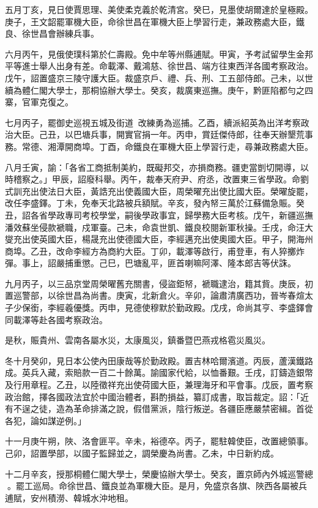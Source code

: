 \begin{pinyinscope}
五月丁亥，見日使賈思理、美使柔克義於乾清宮。癸巳，見墨使胡爾達於皇極殿。庚子，王文韶罷軍機大臣，命徐世昌在軍機大臣上學習行走，兼政務處大臣，鐵良、徐世昌會辦練兵事。

六月丙午，見俄使璞科第於仁壽殿。免中牟等州縣逋賦。甲寅，予考試留學生金邦平等進士舉人出身有差。命載澤、戴鴻慈、徐世昌、端方往東西洋各國考察政治。戊午，詔置盛京三陵守護大臣。裁盛京戶、禮、兵、刑、工五部侍郎。己未，以世續為體仁閣大學士，那桐協辦大學士。癸亥，裁廣東巡撫。庚午，黔匪陷都勻之四寨，官軍克復之。

七月丙子，罷御史巡視五城及街道，改練勇為巡捕。乙酉，續派紹英為出洋考察政治大臣。己丑，以巴塘兵事，開實官捐一年。丙申，賞廷傑侍郎，往奉天辦墾荒事務。常德、湘潭開商埠。丁酉，命鐵良在軍機大臣上學習行走，尋兼政務處大臣。

八月壬寅，諭：「各省工商抵制美約，既礙邦交，亦損商務。疆吏當剴切開導，以時稽察之。」甲辰，詔廢科舉。丙午，裁奉天府尹、府丞，改置東三省學政。命劉式訓充出使法日大臣，黃誥充出使義國大臣，周榮曜充出使比國大臣。榮曜旋罷，改任李盛鐸。丁未，免奉天北路被兵額賦。辛亥，發內帑三萬於江蘇備急賑。癸丑，詔各省學政專司考校學堂，嗣後學政事宜，歸學務大臣考核。戊午，新疆巡撫潘效蘇坐侵款褫職，戍軍臺。己未，命袁世凱、鐵良校閱新軍秋操。壬戌，命汪大燮充出使英國大臣，楊晟充出使德國大臣，李經邁充出使奧國大臣。甲子，開海州商埠。乙丑，改命李經方為商約大臣。丁卯，載澤等啟行，甫登車，有人猝擲炸彈。事上，詔嚴捕重懲。己巳，巴塘亂平，匪首喇嘛阿澤、隆本郎吉等伏誅。

九月丙子，以三品京堂周榮曜舊充關書，侵盜鉅帑，褫職逮治，籍其貲。庚辰，初置巡警部，以徐世昌為尚書。庚寅，北新倉火。辛卯，論肅清廣西功，晉岑春煊太子少保銜，李經羲優獎。丙申，見德使穆默於勤政殿。戊戌，命尚其亨、李盛鐸會同載澤等赴各國考察政治。

是秋，賑貴州、雲南各屬水災，太康風災，鎮番暨巴燕戎格雹災風災。

冬十月癸卯，見日本公使內田康哉等於勤政殿。置吉林哈爾濱道。丙辰，蘆漢鐵路成。英兵入藏，索賠款一百二十餘萬。諭國家代給，以恤番艱。壬戌，訂鑄造銀幣及行用章程。乙丑，以陸徵祥充出使荷國大臣，兼理海牙和平會事。戊辰，置考察政治館，擇各國政法宜於中國治體者，斟酌損益，纂訂成書，取旨裁定。詔：「近有不逞之徒，造為革命排滿之說，假借黨派，陰行叛逆。各疆臣應嚴禁密緝。首從各犯，論如謀逆例。」

十一月庚午朔，陜、洛會匪平。辛未，裕德卒。丙子，罷駐韓使臣，改置總領事。己卯，詔置學部，以國子監歸並之，調榮慶為尚書。乙未，中日新約成。

十二月辛亥，授那桐體仁閣大學士，榮慶協辦大學士。癸亥，置京師內外城巡警總。罷工巡局。命徐世昌、鐵良並為軍機大臣。是月，免盛京各旗、陜西各屬被兵逋賦，安州積澇、韓城水沖地租。


\end{pinyinscope}
